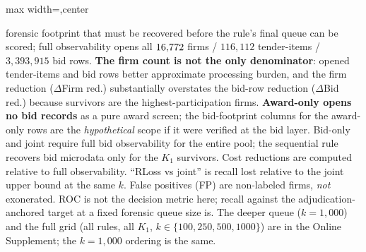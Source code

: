 \begin{table}[htbp]
\begin{adjustbox}{max width=\textwidth,center}
\begin{threeparttable}
\begin{tablenotes}
forensic footprint that must be recovered before the rule's final
queue can be scored; full observability opens all $16{,}772$
firms / $116{,}112$ tender-items / $3{,}393{,}915$ bid rows.
\textbf{The firm count is not the only denominator}: opened
tender-items and bid rows better approximate processing burden, and
the firm reduction ($\Delta$Firm red.) substantially overstates the
bid-row reduction ($\Delta$Bid red.) because survivors are the
highest-participation firms. \textbf{Award-only opens no bid records}
as a pure award screen; the bid-footprint columns for the award-only
rows are the \emph{hypothetical} scope if it were verified at the
bid layer. Bid-only and joint require full bid observability for the
entire pool; the sequential rule recovers bid microdata only for the
$K_1$ survivors. Cost reductions are computed relative to full
observability. ``RLoss vs joint'' is recall lost relative to the
joint upper bound at the same $k$. False positives (FP) are
non-labeled firms, \emph{not} exonerated. ROC is not the decision
metric here; recall against the adjudication-anchored target at a
fixed forensic queue size is. The deeper queue ($k=1{,}000$) and the
full grid (all rules, all $K_1$, $k\in\{100,250,500,1000\}$) are in the
Online Supplement; the $k=1{,}000$ ordering is the same.
\end{tablenotes}
\end{threeparttable}
\end{adjustbox}
\end{table}

